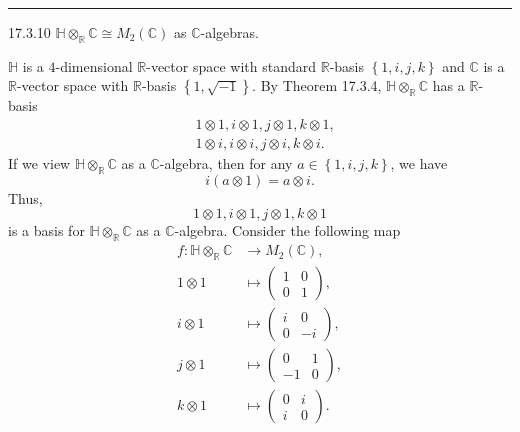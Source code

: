 \documentclass[a4paper, 12pt]{article}
\begin{document}
\noindent\rule{7in}{2.8pt}
\begin{problem}{17.3.10}
\(\mathbb{H}\otimes_\mathbb{R}\mathbb{C}\cong M_2(\mathbb{C})\) as \(\mathbb{C}\)-algebras. 
\end{problem}
\begin{solution}
\(\mathbb{H}\) is a \(4\)-dimensional \(\mathbb{R}\)-vector space with standard \(\mathbb{R}\)-basis \(\left\{ 1,i,j,k \right\}\) and \(\mathbb{C}\) is a \(\mathbb{R}\)-vector 
space with \(\mathbb{R}\)-basis \(\left\{ 1,\sqrt{-1} \right\}\). By Theorem 17.3.4, \(\mathbb{H}\otimes_\mathbb{R}\mathbb{C}\) has a \(\mathbb{R}\)-basis 
\begin{align*}
	&1\otimes 1,i\otimes 1,j\otimes 1,k\otimes 1,\\ 
    &1\otimes i,i\otimes i,j\otimes i,k\otimes i.
\end{align*}
If we view \(\mathbb{H}\otimes_\mathbb{R}\mathbb{C}\) as a \(\mathbb{C}\)-algebra, then for any \(a\in\left\{ 1,i,j,k \right\}\), we have 
\[i(a\otimes 1)=a\otimes i.\]
Thus, 
\[1\otimes 1,i\otimes 1,j\otimes 1,k\otimes 1\]
is a basis for \(\mathbb{H}\otimes_\mathbb{R}\mathbb{C}\) as a \(\mathbb{C}\)-algebra. Consider the following map 
\begin{align*}
	f:\mathbb{H}\otimes_\mathbb{R}\mathbb{C}&\rightarrow M_2(\mathbb{C}),\\ 
	1\otimes 1&\mapsto \begin{pmatrix}
		1&0\\ 
		0&1
	\end{pmatrix},\\[5pt]
	i\otimes 1&\mapsto \begin{pmatrix}
		i&0\\ 
		0&-i
	\end{pmatrix},\\[5pt] 
	j\otimes 1&\mapsto \begin{pmatrix}
		0&1\\ 
		-1&0
	\end{pmatrix},\\[5pt]
    k\otimes 1&\mapsto \begin{pmatrix}
		0&i\\ 
		i&0
	\end{pmatrix}.
\end{align*}

\end{solution}
\end{document}
